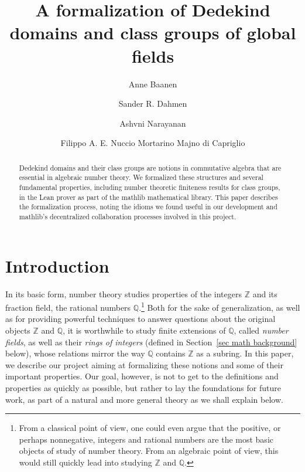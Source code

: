 \documentclass[a4paper,USenglish,cleveref, autoref, thm-restate]{lipics-v2021}
\title{A formalization of Dedekind domains and class groups of global fields}
\author{Anne Baanen}{Department of Computer Science, Vrije Universiteit Amsterdam, The Netherlands \and \url{https://cs.vu.nl/~tbn305}}{t.baanen@vu.nl}{https://orcid.org/0000-0001-8497-3683}
{NWO Vidi grant No. 016.Vidi.189.037, Lean Forward}
\author{Sander R. Dahmen}{Department of Mathematics, Vrije Universiteit Amsterdam, The Netherlands \and \url{https://few.vu.nl/~sdn249/}}{s.r.dahmen@vu.nl}{https://orcid.org/0000-0002-0014-0789}{NWO Vidi grant No. 639.032.613, New Diophantine Directions}
\author{Ashvni Narayanan}{London School of Geometry and Number Theory}{a.narayanan20@imperial.ac.uk}{https://orcid.org/0000-0003-2777-4228}{EPSRC Grant EP/S021590/1 (UK)}
\author{Filippo A. E. Nuccio Mortarino Majno di Capriglio}{Univ Lyon, Université Jean Monnet Saint-Étienne, CNRS UMR 5208, Institut Camille Jordan, F-42023 Saint-\'Etienne, France\and\url {https://perso.univ-st-etienne.fr/nf51454h/index.html}}{filippo.nuccio@univ-st-etienne.fr}{https://orcid.org/0000-0002-5318-9869}{\empty}
\newcommand{\mathlib}{\textsf{mathlib}\xspace}
\newcommand{\Q}{\mathbb{Q}}
\newcommand{\Z}{\mathbb{Z}}
\begin{document}
\maketitle

\begin{abstract}
Dedekind domains and their class groups are notions in commutative algebra that are essential in algebraic number theory.
We formalized these structures and several fundamental properties, including number theoretic finiteness results for class groups, in the Lean prover as part of the \mathlib mathematical library.
This paper describes the formalization process, noting the idioms we found useful in our development and \mathlib's decentralized collaboration processes involved in this project.
\end{abstract}

\section{Introduction}

In its basic form, number theory studies properties of the integers $\Z$
and its fraction field, the rational numbers $\Q$.\footnote{From a classical point of view, one could even argue that the positive, or perhaps nonnegative, integers and rational numbers are the most basic objects of study of number theory. From an algebraic point of view, this would still quickly lead into studying $\Z$ and $\Q$.}
Both for the sake of generalization, as well as for providing powerful techniques to answer questions about the original objects $\Z$ and $\Q$,
it is worthwhile to study finite extensions of $\Q$, called \emph{number fields}, as well as their \emph{rings of integers} (defined in Section~\ref{sec math background} below),
whose relations mirror the way $\Q$ contains $\Z$ as a subring. 
In this paper, we describe our project aiming at formalizing these notions and some of their important properties. Our goal, however, is not to get to the definitions and properties as quickly as possible,
but rather %
to lay the foundations for future work,
as part of a natural and more general theory as we shall explain below.
\end{document}
